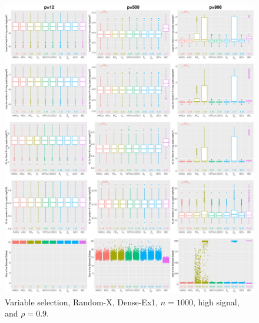 \begin{figure}[!ht]
\centering
\includegraphics[width=\textwidth]{figures/supplement/randomx/subset_selection/Dense-Ex1_n1000_hsnr_rho09.eps}
\caption{Variable selection, Random-X, Dense-Ex1, $n=1000$, high signal, and $\rho=0.9$.}
\end{figure}
\clearpage
